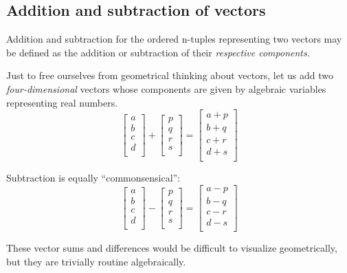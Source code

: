 \documentclass[
  a4paper,
]{article}
\begin{document}
\hypertarget{addition-and-subtraction-of-vectors}{%
\subsection{Addition and subtraction of
vectors}\label{addition-and-subtraction-of-vectors}}

Addition and subtraction for the ordered n-tuples representing two
vectors may be defined as the addition or subtraction of their
\emph{respective components.}

Just to free ourselves from geometrical thinking about vectors, let us
add two \emph{four-dimensional} vectors whose components are given by
algebraic variables representing real numbers. \[
\begin{bmatrix}a\\b\\c\\d\\\end{bmatrix} + \begin{bmatrix}p\\q\\r\\s\\\end{bmatrix} = \begin{bmatrix}a+p\\b+q\\c+r\\d+s\\\end{bmatrix}
\]

Subtraction is equally ``commonsensical'': \[
\begin{bmatrix}a\\b\\c\\d\\\end{bmatrix} - \begin{bmatrix}p\\q\\r\\s\\\end{bmatrix} = \begin{bmatrix}a-p\\b-q\\c-r\\d-s\\\end{bmatrix}
\]

These vector sums and differences would be difficult to visualize
geometrically, but they are trivially routine algebraically.
\end{document}
